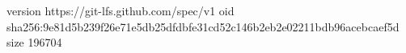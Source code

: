 version https://git-lfs.github.com/spec/v1
oid sha256:9e81d5b239f26e71e5db25dfdbfe31cd52c146b2eb2e02211bdb96acebcaef5d
size 196704
